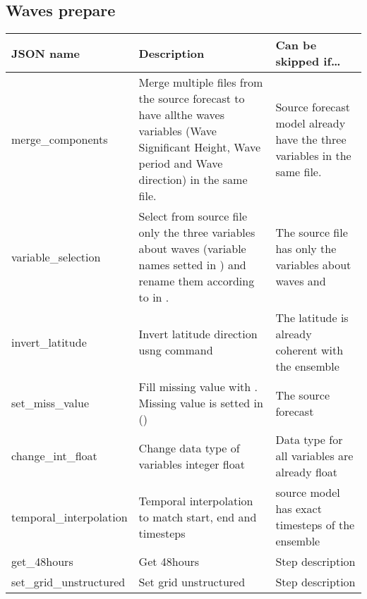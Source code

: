 \documentclass[letterpaper,10pt,english]{sphinxmanual}
\begin{document}
\subsection{Waves prepare}
\label{\detokenize{configuration/index:waves-prepare}}

\begin{savenotes}\sphinxattablestart
\centering
{}
\sphinxthecaptionisattop
{}\label{\detokenize{configuration/index:id2}}
\sphinxaftertopcaption
\begin{tabulary}{\linewidth}[t]{|T|T|T|}
\hline
\sphinxstyletheadfamily 
JSON name
&\sphinxstyletheadfamily 
Description
&\sphinxstyletheadfamily 
Can be skipped if…
\\
\hline
merge\_components
&
Merge multiple files from the source forecast to have allthe waves variables (Wave Significant Height, Wave period and Wave direction) in the same file.
&
Source forecast model already have the three variables in the same file.
\\
\hline
variable\_selection
&
Select from source file only the three variables about waves (variable names setted in {\hyperref[\detokenize{configuration/index:src-config}]{}}) and rename them according to  in .
&
The source file has only the variables about waves and
\\
\hline
invert\_latitude
&
Invert latitude direction usng  command
&
The latitude is already coherent with the ensemble
\\
\hline
set\_miss\_value
&
Fill missing value with  . Missing value is setted in {\hyperref[\detokenize{configuration/index:src-config}]{}} ()
&
The source forecast
\\
\hline
change\_int\_float
&
Change data type of variables integer  float
&
Data type for all variables are already float
\\
\hline
temporal\_interpolation
&
Temporal interpolation to match start, end and timesteps
&
source model has exact timesteps of the ensemble
\\
\hline
get\_48hours
&
Get 48hours
&
Step description
\\
\hline
set\_grid\_unstructured
&
Set grid unstructured
&
Step description
\\

\end{tabulary}
\end{savenotes}
\end{document}
